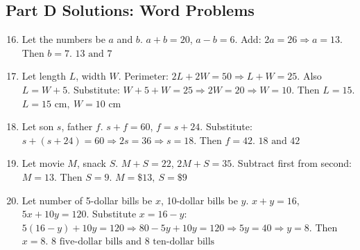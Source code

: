 \documentclass[14pt]{extarticle}
\begin{document}
\subsection*{Part D Solutions: Word Problems}
\begin{enumerate}
  \setcounter{enumi}{15}
  \item Let the numbers be \(a\) and \(b\).  
  \(a + b = 20\), \(a - b = 6\). Add: \(2a = 26 \Rightarrow a = 13\). Then \(b = 7\).  
  \(\boxed{13 \text{ and } 7}\)

  \item Let length \(L\), width \(W\).  
  Perimeter: \(2L + 2W = 50 \Rightarrow L + W = 25\). Also \(L = W + 5\).  
  Substitute: \(W + 5 + W = 25 \Rightarrow 2W = 20 \Rightarrow W = 10\). Then \(L = 15\).  
  \(\boxed{L = 15 \text{ cm},\ W = 10 \text{ cm}}\)

  \item Let son \(s\), father \(f\).  
  \(s + f = 60\), \(f = s + 24\). Substitute: \(s + (s + 24) = 60 \Rightarrow 2s = 36 \Rightarrow s = 18\). Then \(f = 42\).  
  \(\boxed{18 \text{ and } 42}\)

  \item Let movie \(M\), snack \(S\).  
  \(M + S = 22\), \(2M + S = 35\). Subtract first from second: \(M = 13\). Then \(S = 9\).  
  \(\boxed{M = \$13,\ S = \$9}\)

  \item Let number of 5-dollar bills be \(x\), 10-dollar bills be \(y\).  
  \(x + y = 16\), \(5x + 10y = 120\). Substitute \(x = 16 - y\):  
  \(5(16 - y) + 10y = 120 \Rightarrow 80 - 5y + 10y = 120 \Rightarrow 5y = 40 \Rightarrow y = 8\).  
  Then \(x = 8\).  
  \(\boxed{8 \text{ five-dollar bills and } 8 \text{ ten-dollar bills}}\)
\end{enumerate}




\end{document}
